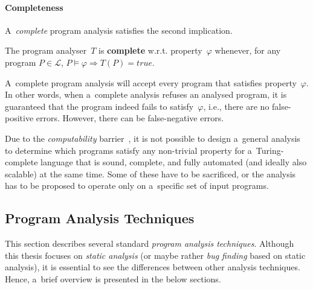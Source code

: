 \paragraph{Completeness}
A~\emph{complete} program analysis satisfies the second implication.
\begin{definition}
    The program analyser~$ T $ is \textbf{complete} w.r.t. property~$ \varphi $ whenever, for any program $ P \in \mathcal{L} $, $ P \models \varphi \Longrightarrow T(P) = true $.
\end{definition}
A~complete program analysis will accept every program that satisfies property~$ \varphi $. In other words, when a~complete analysis refuses an analysed program, it is guaranteed that the program indeed fails to satisfy~$ \varphi $, i.e., there are no false-positive errors. However, there can be false-negative errors.

Due to the \emph{computability} barrier~\cite{rice}, it is not possible to design a~general analysis to determine which programs satisfy any non-trivial property for a~Turing-complete language that is sound, complete, and fully automated (and ideally also scalable) at the same time. Some of these have to be sacrificed, or the analysis has to be proposed to operate only on a~specific set of input programs.

\subsection{Program Analysis Techniques}
\label{sec:analysisTechniques}

This section describes several standard \emph{program analysis techniques}. Although this thesis focuses on \emph{static analysis} (or maybe rather \emph{bug finding} based on static analysis), it is essential to see the differences between other analysis techniques. Hence, a~brief overview is presented in the below sections.

